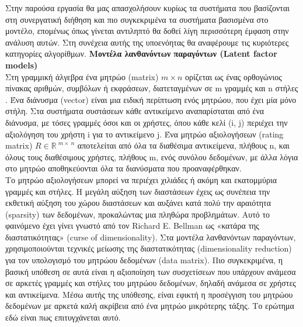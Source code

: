 Στην παρούσα εργασία θα μας απασχολήσουν κυρίως τα συστήματα που βασίζονται στη συνεργατική διήθηση και πιο συγκεκριμένα τα συστήματα βασισμένα στο μοντέλο, επομένως όπως γίνεται αντιληπτό θα δοθεί λίγη περισσότερη έμφαση στην ανάλυση αυτών.
Στη συνέχεια αυτής της υποενόητας θα αναφέρουμε τις κυριότερες κατηγορίες αλγορίθμων.
\newpage
\noindent
\textbf{Μοντέλα λανθανόντων παραγόντων (Latent factor models) }
\\
Στη γραμμική άλγεβρα ένα μητρώο (matrix) $ m\times n $ ορίζεται ως ένας ορθογώνιος πίνακας αριθμών, συμβόλων ή εκφράσεων, διατεταγμένων σε m γραμμές και n στήλες \cite{beauregardFirstCourseLinear1973}. Ένα διάνυσμα (vector) είναι μια ειδική περίπτωση ενός μητρώου, που έχει μία μόνο στήλη. Στα συστήματα συστάσεων κάθε αντικείμενο αναπαρίσταται από ένα διάνυσμα, με τόσες γραμμές όσοι και οι χρήστες, όπου κάθε κελί (i, j) περιέχει την αξιολόγηση του χρήστη i για το αντικείμενο j. Ένα μητρώο αξιολογήσεων (rating matrix) $  R\in{\mathbb{R}\ }^{m\times\ n} $ αποτελείται από όλα τα διαθέσιμα αντικείμενα, πλήθους n, και όλους τους διαθέσιμους χρήστες, πλήθους m, ενός συνόλου δεδομένων, με άλλα λόγια στο μητρώο αποθηκεύονται όλα τα διανύσματα που προαναφέρθηκαν.\\
Το μητρώο αξιολογήσεων μπορεί να περιέχει χιλιάδες ή ακόμη και εκατομμύρια γραμμές και στήλες. Η μεγάλη αύξηση των διαστάσεων έχεις ως συνέπεια την εκθετική αύξηση του χώρου διαστάσεων και αυξάνει κατά πολύ την αραιότητα (sparsity) των δεδομένων, προκαλώντας μια πληθώρα προβλημάτων. Αυτό το φαινόμενο έχει γίνει γνωστό από τον Richard E. Bellman \cite{bellman1957dynamic} ως «κατάρα της διαστατικότητας» (curse of dimensionality). Στα μοντέλα λανθανόντων παραγόντων, χρησιμοποιούνται τεχνικές μείωσης της διαστατικότητας (dimensionality reduction) για τον υπολογισμό του μητρώου δεδομένων (data matrix). Πιο συγκεκριμένα, η βασική υπόθεση σε αυτά είναι η αξιοποίηση των συσχετίσεων που υπάρχουν ανάμεσα σε αρκετές γραμμές και στήλες του μητρώου δεδομένων, δηλαδή ανάμεσα σε χρήστες και αντικείμενα. Μέσω αυτής της υπόθεσης, είναι εφικτή η προσέγγιση του μητρώου δεδομένων με αρκετά καλή ακρίβεια από ένα μητρώο μικρότερης τάξης. Το ερώτημα εδώ είναι πως επιτυγχάνεται αυτό.
\\\\
